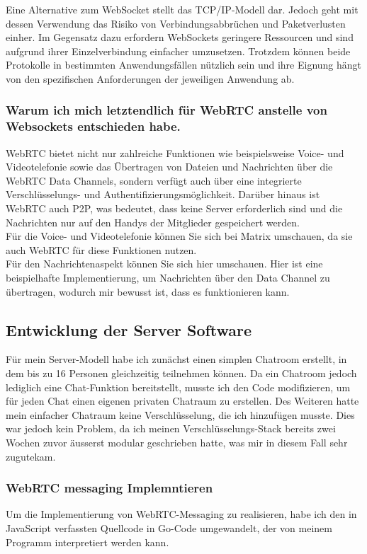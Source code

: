 Eine Alternative zum WebSocket stellt das TCP/IP-Modell dar. Jedoch geht mit dessen Verwendung das Risiko von Verbindungsabbrüchen und Paketverlusten einher. Im Gegensatz dazu erfordern WebSockets geringere Ressourcen und sind aufgrund ihrer Einzelverbindung einfacher umzusetzen. Trotzdem können beide Protokolle in bestimmten Anwendungsfällen nützlich sein und ihre Eignung hängt von den spezifischen Anforderungen der jeweiligen Anwendung ab.
\subsubsection{Warum ich mich letztendlich für WebRTC anstelle von Websockets entschieden habe.}
WebRTC \cite{webrtc-website} bietet nicht nur zahlreiche Funktionen wie beispielsweise Voice- und Videotelefonie sowie das Übertragen von Dateien und Nachrichten über die WebRTC Data Channels, sondern verfügt auch über eine integrierte Verschlüsselungs- \cite{rfc8829} und Authentifizierungsmöglichkeit. Darüber hinaus ist WebRTC auch P2P, was bedeutet, dass keine Server erforderlich sind und die Nachrichten nur auf den Handys der Mitglieder gespeichert werden. \\
Für die Voice- und Videotelefonie können Sie sich bei Matrix umschauen, da sie auch WebRTC für diese Funktionen nutzen. \cite{matrix-website}\\
Für den Nachrichtenaspekt können Sie sich hier \cite{webrtc-msg} umschauen. Hier ist eine beispielhafte Implementierung, um Nachrichten über den Data Channel zu übertragen, wodurch mir bewusst ist, dass es funktionieren kann.
\subsection{Entwicklung der Server Software}
Für mein Server-Modell habe ich zunächst einen simplen Chatroom erstellt, in dem bis zu 16 Personen gleichzeitig teilnehmen können. Da ein Chatroom jedoch lediglich eine Chat-Funktion bereitstellt, musste ich den Code modifizieren, um für jeden Chat einen eigenen privaten Chatraum zu erstellen. Des Weiteren hatte mein einfacher Chatraum keine Verschlüsselung, die ich hinzufügen musste. Dies war jedoch kein Problem, da ich meinen Verschlüsselungs-Stack bereits zwei Wochen zuvor äusserst modular geschrieben hatte, was mir in diesem Fall sehr zugutekam.
\subsubsection{WebRTC messaging Implemntieren}
Um die Implementierung von WebRTC-Messaging zu realisieren, habe ich den in JavaScript verfassten Quellcode \cite{webrtc-messegaing-example-js} in Go-Code umgewandelt, der von meinem Programm interpretiert werden kann.
